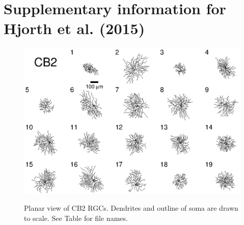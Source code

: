\documentclass{article}
\begin{document}
\pagestyle{empty}


\section*{Supplementary information for Hjorth et al. (2015)}

\newcommand{\beginsupplement}{%
  \setcounter{table}{0}
  \renewcommand{\thetable}{S\arabic{table}}%
  \setcounter{figure}{0}
  \renewcommand{\thefigure}{S\arabic{figure}}%
}

\beginsupplement

%
%


\begin{figure}[h]
  \centering
  {\includegraphics[scale=1.5]{Figures/SupFig1/CB2-all-cells-1.eps}}
  \caption{Planar view of CB2 RGCs. Dendrites and outline of soma are
    drawn to scale. See Table \protect{\ref{CB2filenames}} for file
    names. \label{CB2planar}}
\end{figure}
\end{document}
